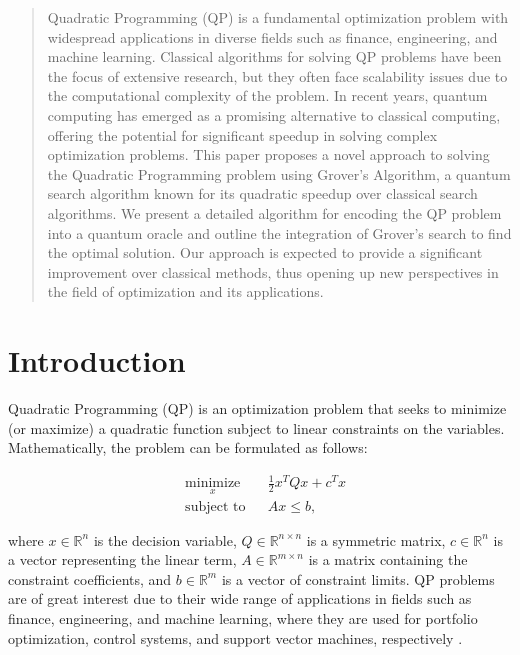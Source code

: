 \begin{abstract}

Quadratic Programming (QP) is a fundamental optimization problem with widespread applications in diverse fields such as finance, engineering, and machine learning. Classical algorithms for solving QP problems have been the focus of extensive research, but they often face scalability issues due to the computational complexity of the problem. In recent years, quantum computing has emerged as a promising alternative to classical computing, offering the potential for significant speedup in solving complex optimization problems. This paper proposes a novel approach to solving the Quadratic Programming problem using Grover's Algorithm, a quantum search algorithm known for its quadratic speedup over classical search algorithms. We present a detailed algorithm for encoding the QP problem into a quantum oracle and outline the integration of Grover's search to find the optimal solution. Our approach is expected to provide a significant improvement over classical methods, thus opening up new perspectives in the field of optimization and its applications.

\end{abstract}

\section{Introduction}

Quadratic Programming (QP) is an optimization problem that seeks to minimize (or maximize) a quadratic function subject to linear constraints on the variables. Mathematically, the problem can be formulated as follows:

\begin{equation}
\begin{aligned}
& \underset{x}{\text{minimize}}
& & \frac{1}{2}x^TQx + c^Tx \\
& \text{subject to}
& & Ax \leq b,
\end{aligned}
\end{equation}

where $x \in \mathbb{R}^n$ is the decision variable, $Q \in \mathbb{R}^{n \times n}$ is a symmetric matrix, $c \in \mathbb{R}^n$ is a vector representing the linear term, $A \in \mathbb{R}^{m \times n}$ is a matrix containing the constraint coefficients, and $b \in \mathbb{R}^m$ is a vector of constraint limits. QP problems are of great interest due to their wide range of applications in fields such as finance, engineering, and machine learning, where they are used for portfolio optimization, control systems, and support vector machines, respectively \cite{boyd2004convex}.

